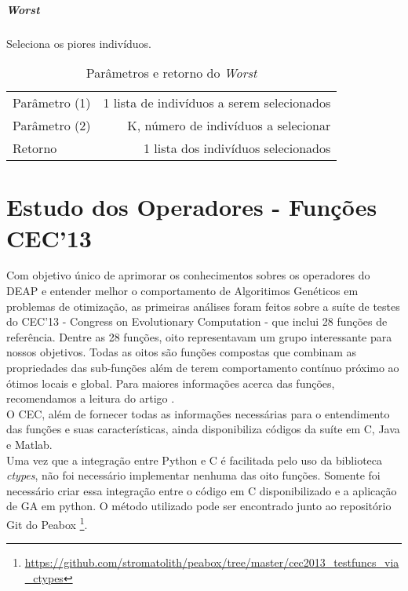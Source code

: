 \subparagraph{Worst}
Seleciona os piores indivíduos.\\

\begin{table}[!h]
  \begin{center}
  \begin{tabular}{|l|r|}
    \hline
    Parâmetro (1) & 1 lista de indivíduos a serem selecionados \\
    Parâmetro (2) & K, número de indivíduos a selecionar \\
    Retorno & 1 lista dos indivíduos selecionados\\
    \hline    
  \end{tabular}
  \end{center}
  \caption{Parâmetros e retorno do {\it Worst}}
  \label{Worst}
\end{table}

\clearpage

\section{Estudo dos Operadores - Funções CEC'13}
Com objetivo único de aprimorar os conhecimentos sobres os operadores do DEAP e entender melhor o comportamento de Algoritimos Genéticos em problemas de otimização, as primeiras análises foram feitos sobre a suíte de testes do CEC'13 - Congress on Evolutionary Computation - que inclui 28 funções de referência. Dentre as 28 funções, oito representavam um grupo interessante para nossos objetivos. Todas as oitos são funções compostas que combinam as propriedades das sub-funções além de terem comportamento contínuo próximo ao ótimos locais e global. Para maiores informações acerca das funções, recomendamos a leitura do artigo \citep{liang2013problem}.\\

O CEC, além de fornecer todas as informações necessárias para o entendimento das funções e suas características, ainda disponibiliza códigos da suíte em C, Java e Matlab.\\%

Uma vez que a integração entre Python e C é facilitada pelo uso da biblioteca {\it ctypes}, não foi necessário implementar nenhuma das oito funções. Somente foi necessário criar essa integração entre o código em C disponibilizado e a aplicação de GA em python. O método utilizado pode ser encontrado junto ao repositório Git do Peabox \footnote[6]{\url {https://github.com/stromatolith/peabox/tree/master/cec2013_testfuncs_via_ctypes}}.\\



